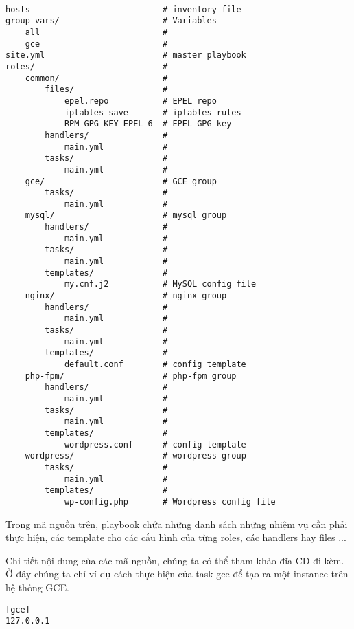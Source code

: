 \begin{lstlisting}[label={lst:labs_gce-wordpress-nginx_playbook},caption={Cấu trúc của playbook dùng để giải quyết bài toán đặt ra},morekeywords={hosts, group_vars, roles, tasks, files, handlers, templates, common}]

hosts                           # inventory file
group_vars/                     # Variables
    all                         #
    gce                         #
site.yml                        # master playbook
roles/                          #
    common/                     #
        files/                  #
            epel.repo           # EPEL repo
            iptables-save       # iptables rules
            RPM-GPG-KEY-EPEL-6  # EPEL GPG key
        handlers/               #
            main.yml            #
        tasks/                  #
            main.yml            #
    gce/                        # GCE group
        tasks/                  #
            main.yml            #
    mysql/                      # mysql group
        handlers/               #
            main.yml            #
        tasks/                  #
            main.yml            #
        templates/              #
            my.cnf.j2           # MySQL config file
    nginx/                      # nginx group
        handlers/               #
            main.yml            #
        tasks/                  #
            main.yml            #
        templates/              #
            default.conf        # config template
    php-fpm/                    # php-fpm group
        handlers/               #
            main.yml            #
        tasks/                  #
            main.yml            #
        templates/              #
            wordpress.conf      # config template
    wordpress/                  # wordpress group
        tasks/                  #
            main.yml            #
        templates/              #
            wp-config.php       # Wordpress config file

\end{lstlisting}

Trong mã nguồn trên, playbook chứa những danh sách những nhiệm vụ cần phải thực hiện, các template cho các cấu hình của từng roles, các handlers hay files ...

Chi tiết nội dung của các mã nguồn, chúng ta có thể tham khảo đĩa CD đi kèm. Ở đây chúng ta chỉ ví dụ cách thực hiện của task gce để tạo ra một instance trên hệ thống GCE.

\begin{lstlisting}[label={lst:labs_gce-wordpress-nginx_hosts},caption={Inventory file - hosts},morekeywords={name, hosts, gather_facts: no, roles, sudo, remote_user}]
[gce]
127.0.0.1
\end{lstlisting}

